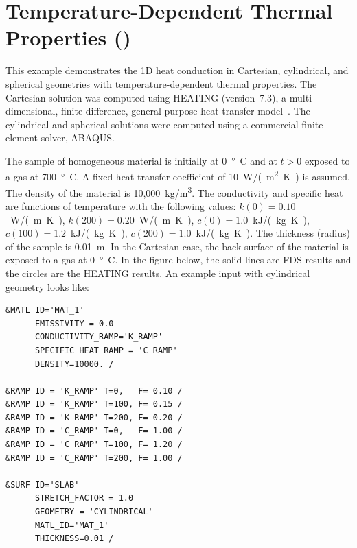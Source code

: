 \documentclass[11pt]{book}
\begin{document}
\clearpage

\section{Temperature-Dependent Thermal Properties (\texorpdfstring{}{heat\_conduction\_kc})}

This example demonstrates the 1D heat conduction in Cartesian, cylindrical, and spherical geometries with temperature-dependent thermal properties.
The Cartesian solution was computed using HEATING (version~7.3), a multi-dimensional, finite-difference, general purpose heat transfer
model~\cite{Childs}. The cylindrical and spherical solutions were computed using a commercial finite-element solver, ABAQUS.

The sample of homogeneous material is initially at 0~\si{\degree C} and at $t>0$ exposed to a gas at 700~\si{\degree C}. A fixed heat transfer coefficient of
10~\si{W/(m^2.K)} is assumed. The density of the material is 10,000~\si{kg/m^3}. The conductivity and specific heat are functions of temperature with the
following values: $k(0)=0.10$~\si{W/(m.K)}, $k(200)=0.20$~\si{W/(m.K)}, $c(0)=1.0$~\si{kJ/(kg.K)}, $c(100)=1.2$~\si{kJ/(kg.K)}, $c(200)=1.0$~\si{kJ/(kg.K)}. The thickness (radius) of
the sample is 0.01~m. In the Cartesian case, the back surface of the material is exposed to a gas at 0~\si{\degree C}. In the figure below, the solid
lines are FDS results and the circles are the HEATING results. An example input with cylindrical geometry looks like:

\begin{lstlisting}
&MATL ID='MAT_1'
      EMISSIVITY = 0.0
      CONDUCTIVITY_RAMP='K_RAMP'
      SPECIFIC_HEAT_RAMP = 'C_RAMP'
      DENSITY=10000. /

&RAMP ID = 'K_RAMP' T=0,   F= 0.10 /
&RAMP ID = 'K_RAMP' T=100, F= 0.15 /
&RAMP ID = 'K_RAMP' T=200, F= 0.20 /
&RAMP ID = 'C_RAMP' T=0,   F= 1.00 /
&RAMP ID = 'C_RAMP' T=100, F= 1.20 /
&RAMP ID = 'C_RAMP' T=200, F= 1.00 /

&SURF ID='SLAB'
      STRETCH_FACTOR = 1.0
      GEOMETRY = 'CYLINDRICAL'
      MATL_ID='MAT_1'
      THICKNESS=0.01 /
\end{lstlisting}
\end{document}
